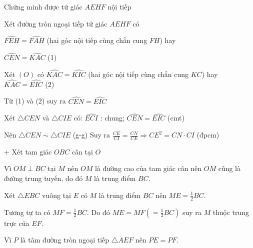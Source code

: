 \begin{ex}
{\begin{center}
			
			
		\end{center}
		Chứng minh được tứ giác $AEHF$ nội tiếp
		
		Xét đường tròn ngoại tiếp tứ giác $AEHF$ có
		
		$\widehat{FEH} = \widehat{FAH}$ (hai góc nội tiếp cùng chắn cung $FH$) hay
		
		$\widehat{CEN} = \widehat{KAC}$ (1)
		
		Xét $(O)$ có $\widehat{KAC} = \widehat{KIC}$ (hai góc nội tiếp cùng chắn cung $KC$) hay $\widehat{KAC} = \widehat{EIC}$ (2)
		
		Từ (1) và (2) suy ra $\widehat{CEN} = \widehat{EIC}$
		
		Xét $\triangle CEN$ và $\triangle CIE$ có: $\widehat{ECI}$ : chung; $\widehat{CEN} = \widehat{EIC}$ (cmt)
		
		Nên $\triangle CEN \sim \triangle CIE$ (g-g) Suy ra $\frac{CE}{CI} = \frac{CN}{CE} \Rightarrow CE^2 = CN \cdot CI$ (đpcm)
		
		+ Xét tam giác $OBC$ cân tại $O$
		
		Vì $OM \perp BC$ tại $M$ nên $OM$ là đường cao của tam giác cân nên $OM$ cũng là đường trung tuyến, do đó $M$ là trung điểm $BC$.
		
		Xét $\triangle EBC$ vuông tại $E$ có $M$ là trung điểm $BC$ nên $ME = \frac{1}{2}BC$.
		
		Tương tự ta có $MF = \frac{1}{2}BC$. Do đó $ME = MF (= \frac{1}{2}BC)$ suy ra $M$ thuộc trung trực của $EF$.
		
		Vì $P$ là tâm đường tròn ngoại tiếp $\triangle AEF$ nên $PE = PF$.
		
}
\end{ex}
